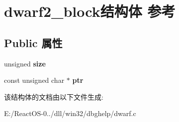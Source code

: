 \hypertarget{structdwarf2__block}{}\section{dwarf2\+\_\+block结构体 参考}
\label{structdwarf2__block}
\subsection*{Public 属性}
\begin{DoxyCompactItemize}
\item 
\mbox{\label{structdwarf2__block_a9f7b90b9c2585fdaa83e9450963f14b2}} 
unsigned {\bfseries size}
\item 
\mbox{\label{structdwarf2__block_a1d1c54790220184f69dcd2c4ca47dae8}} 
const unsigned char $\ast$ {\bfseries ptr}
\end{DoxyCompactItemize}


该结构体的文档由以下文件生成\+:\begin{DoxyCompactItemize}
\item 
E\+:/\+React\+O\+S-\/0../dll/win32/dbghelp/dwarf.\+c\end{DoxyCompactItemize}
